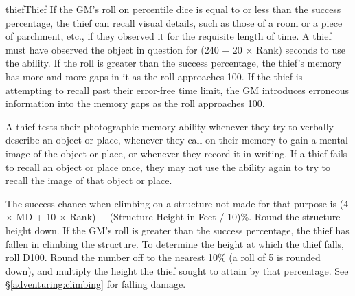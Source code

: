 \begin{Skill}[1.2]{thief}{Thief}
If the GM’s roll on percentile dice is equal to or less than the
success percentage, the thief can recall visual details, such as those
of a room or a piece of parchment, etc., if they observed it for the
requisite length of time.  A thief must have observed the object in
question for (240 − 20 × Rank) seconds to use the ability. If the roll
is greater than the success percentage, the thief’s memory has more
and more gaps in it as the roll approaches 100.  If the thief is
attempting to recall past their error-free time limit, the GM
introduces erroneous information into the memory gaps as the roll
approaches 100.

A thief tests their photographic memory ability whenever they try to
verbally describe an object or place, whenever they call on their
memory to gain a mental image of the object or place, or whenever they
record it in writing. If a thief fails to recall an object or place
once, they may not use the ability again to try to recall the image of
that object or place.



The success chance when climbing on a structure not made for that
purpose is (4 × MD + 10 × Rank) − (Structure Height in Feet / 10)\%.
Round the structure height down.  If the GM’s roll is greater than the
success percentage, the thief has fallen in climbing the structure.
To determine the height at which the thief falls, roll D100. Round the
number off to the nearest 10\% (a roll of 5 is rounded down), and
multiply the height the thief sought to attain by that percentage.
See \S\ref{adventuring:climbing} for falling damage.

\end{Skill}
